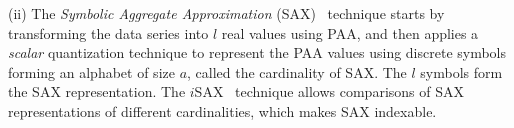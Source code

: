 \noindent(ii) 
The {\it Symbolic Aggregate Approximation} (SAX)~\cite{conf/dmkd/LinKLC03} technique starts by transforming the data series into $l$ real values using PAA, and then applies a \emph{scalar} quantization technique to represent the PAA values 
using discrete symbols forming an alphabet of size $a$, called the cardinality of SAX. 
The $l$ symbols form the SAX representation. %
The $i$SAX~\cite{conf/kdd/Shieh2008} technique %
allows comparisons of SAX representations of different cardinalities, which makes SAX indexable. 



